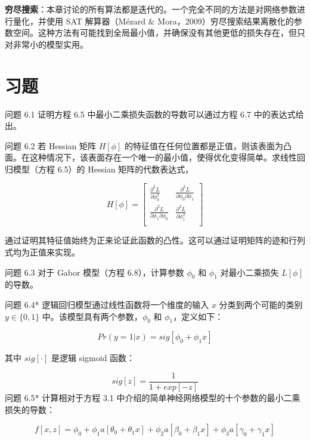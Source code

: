 \documentclass[lang=cn,newtx,10pt,scheme=chinese]{elegantbook}
\begin{document}
\textbf{穷尽搜索}：本章讨论的所有算法都是迭代的。一个完全不同的方法是对网络参数进行量化，并使用 SAT 解算器（Mézard \& Mora，2009）穷尽搜索结果离散化的参数空间。这种方法有可能找到全局最小值，并确保没有其他更低的损失存在，但只对非常小的模型实用。

\section{习题}
问题 6.1 证明方程 6.5 中最小二乘损失函数的导数可以通过方程 6.7 中的表达式给出。

问题 6.2 若 Hessian 矩阵 \(H[\phi]\) 的特征值在任何位置都是正值，则该表面为凸面。在这种情况下，该表面存在一个唯一的最小值，使得优化变得简单。求线性回归模型（方程 6.5）的 Hessian 矩阵的代数表达式，

\begin{equation}
H[\phi] = \begin{bmatrix}
\frac{\partial^2 L}{\partial \phi_0^2} & \frac{\partial^2 L}{\partial \phi_0 \partial \phi_1}  \\
\frac{\partial^2 L}{\partial \phi_1 \partial \phi_0} & \frac{\partial^2 L}{\partial \phi_1^2}  \\
\end{bmatrix} 
\end{equation}

通过证明其特征值始终为正来论证此函数的凸性。这可以通过证明矩阵的迹和行列式均为正值来实现。

问题 6.3 对于 Gabor 模型（方程 6.8），计算参数 \(\phi_0\) 和 \(\phi_1\) 对最小二乘损失 \(L[\phi]\) 的导数。

问题 6.4* 逻辑回归模型通过线性函数将一个维度的输入 \(x\) 分类到两个可能的类别 \(y \in \{0,1\}\) 中。该模型具有两个参数，\(\phi_0\) 和 \(\phi_1\)，定义如下：

\begin{equation}
Pr(y = 1|x) = sig[\phi_0 + \phi_1x] 
\end{equation}

其中 \(sig[\cdot]\) 是逻辑 sigmoid 函数：

\begin{equation}
sig[z] = \frac{1}{1 + exp[-z]} 
\end{equation}
问题 6.5* 计算相对于方程 3.1 中介绍的简单神经网络模型的十个参数的最小二乘损失的导数：

\begin{equation}
f[x,z] = \phi_0 + \phi_1a[\theta_0 + \theta_1x] + \phi_2a[\beta_0 + \beta_1x] + \phi_3a[\gamma_0 + \gamma_1x] 
\end{equation}
\end{document}

